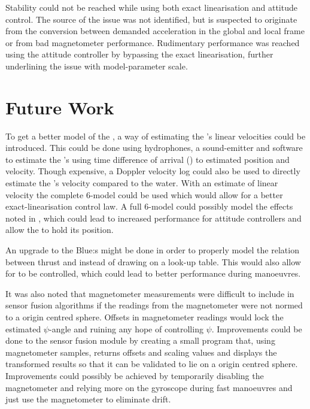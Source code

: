 Stability could not be reached while using both exact linearisation and attitude control. The source of the issue was not identified, but is suspected to originate from the conversion between demanded acceleration in the global and local frame or from bad magnetometer performance. Rudimentary performance was reached using the attitude controller by bypassing the exact linearisation, further underlining the issue with model-parameter scale.
\section{Future Work}
To get a better model of the \abbrROV, a way of estimating the \abbrROV's linear velocities could be introduced. This could be done using hydrophones, a sound-emitter and software to estimate the \abbrROV's using time difference of arrival (\abbrTDOA) to estimated position and velocity. Though expensive, a Doppler velocity log could also be used to directly estimate the \abbrROV's velocity compared to the water.
With an estimate of linear velocity the complete 6-\abbrDOF model could be used which would allow for a better exact-linearisation control law. A full 6-\abbrDOF model could possibly model the effects noted in , which could lead to increased performance for attitude controllers and allow the \abbrROV to hold its position.

An upgrade to the Blue\abbrESC:s might be done in order to properly model the relation between thrust and \abbrRPM instead of drawing on a look-up table. This would also allow for \abbrRPM to be controlled, which could lead to better performance during manoeuvres. 

It was also noted that magnetometer measurements were difficult to include in sensor fusion algorithms if the readings from the magnetometer were not normed to a origin centred sphere. Offsets in magnetometer readings would lock the estimated $\psi$-angle and ruining any hope of controlling $\psi$. Improvements could be done to the sensor fusion module by creating a small program that, using magnetometer samples, returns offsets and scaling values and displays the transformed results so that it can be validated to lie on a origin centred sphere.
Improvements could possibly be achieved by temporarily disabling the magnetometer and relying more on the gyroscope during fast manoeuvres and just use the magnetometer to eliminate drift. 